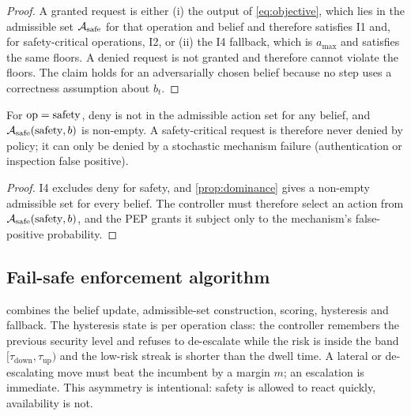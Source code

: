 \begin{proof}
A granted request is either (i) the output of \eqref{eq:objective}, which lies
in the admissible set $\mathcal{A}_{\mathrm{safe}}$ for that operation and belief and therefore
satisfies I1 and, for safety-critical operations, I2, or (ii) the I4 fallback,
which is $a_{\max}$ and satisfies the same floors. A denied request is not
granted and therefore cannot violate the floors. The claim holds for an
adversarially chosen belief because no step uses a correctness assumption about
$b_t$.
\end{proof}

\begin{proposition}
\label{prop:liveness}
For $\mathrm{op}=\text{safety}$, deny is not in the admissible action set for any belief,
and $\mathcal{A}_{\mathrm{safe}}(\text{safety},b)$ is non-empty. A safety-critical request is
therefore never denied by policy; it can only be denied by a stochastic
mechanism failure (authentication or inspection false positive).
\end{proposition}

\begin{proof}
I4 excludes deny for safety, and \cref{prop:dominance} gives a non-empty
admissible set for every belief. The controller must therefore select an action
from $\mathcal{A}_{\mathrm{safe}}(\text{safety},b)$, and the PEP grants it subject only to the
mechanism's false-positive probability.
\end{proof}

\subsection{Fail-safe enforcement algorithm}
\label{sec:algorithm}

 combines the belief update, admissible-set construction,
scoring, hysteresis and fallback. The hysteresis state is per operation class:
the controller remembers the previous security level and refuses to de-escalate
while the risk is inside the band $[\tau_{\mathrm{down}},\tau_{\mathrm{up}})$
and the low-risk streak is shorter than the dwell time. A lateral or
de-escalating move must beat the incumbent by a margin $m$; an escalation is
immediate. This asymmetry is intentional: safety is allowed to react quickly,
availability is not.

